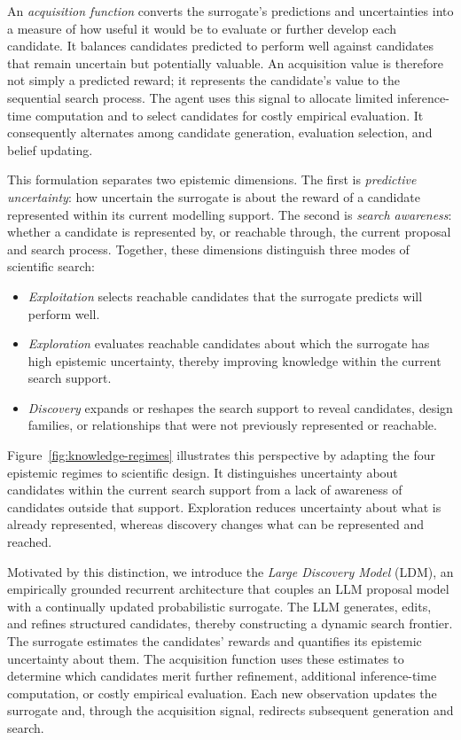 An \emph{acquisition function} converts the surrogate's predictions and
uncertainties into a measure of how useful it would be to evaluate or further
develop each candidate. It balances candidates predicted to perform well
against candidates that remain uncertain but potentially valuable. An
acquisition value is therefore not simply a predicted reward; it represents
the candidate's value to the sequential search process. The agent uses this
signal to allocate limited inference-time computation and to select candidates
for costly empirical evaluation. It consequently alternates among candidate
generation, evaluation selection, and belief updating.

This formulation separates two epistemic dimensions. The first is
\emph{predictive uncertainty}: how uncertain the surrogate is about the reward
of a candidate represented within its current modelling support. The second is
\emph{search awareness}: whether a candidate is represented by, or reachable
through, the current proposal and search process. Together, these dimensions
distinguish three modes of scientific search:

\begin{itemize}
    \item \emph{Exploitation} selects reachable candidates that the surrogate
    predicts will perform well.

    \item \emph{Exploration} evaluates reachable candidates about which the
    surrogate has high epistemic uncertainty, thereby improving knowledge
    within the current search support.

    \item \emph{Discovery} expands or reshapes the search support to reveal
    candidates, design families, or relationships that were not previously
    represented or reachable.
\end{itemize}

Figure~\ref{fig:knowledge-regimes} illustrates this perspective by adapting
the four epistemic regimes to scientific design. It distinguishes uncertainty
about candidates within the current search support from a lack of awareness of
candidates outside that support. Exploration reduces uncertainty about what is
already represented, whereas discovery changes what can be represented and
reached.

Motivated by this distinction, we introduce the \emph{Large Discovery Model}
(LDM), an empirically grounded recurrent architecture that couples an LLM
proposal model with a continually updated probabilistic surrogate. The LLM
generates, edits, and refines structured candidates, thereby constructing a
dynamic search frontier. The surrogate estimates the candidates' rewards and
quantifies its epistemic uncertainty about them. The acquisition function uses
these estimates to determine which candidates merit further refinement,
additional inference-time computation, or costly empirical evaluation. Each
new observation updates the surrogate and, through the acquisition signal,
redirects subsequent generation and search.

